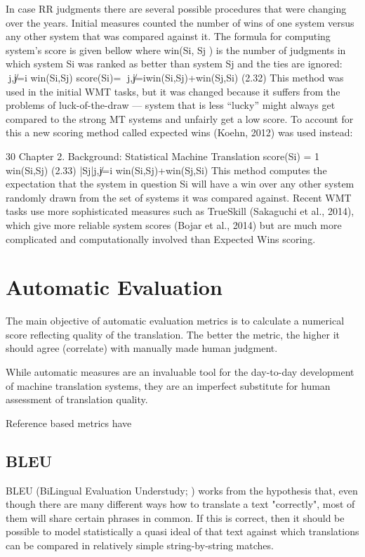 In case RR judgments there are several possible procedures that were changing over the years. Initial measures counted the number of wins of one system versus any other system that was compared against it. The formula for computing system’s score is given bellow where win(Si, Sj ) is the number of judgments in which system Si was ranked as better than system Sj and the ties are ignored:
􏰇j,j̸=i win(Si,Sj)
score(Si)= 􏰇j,j̸=iwin(Si,Sj)+win(Sj,Si) (2.32)
This method was used in the initial WMT tasks, but it was changed because it suffers from the problems of luck-of-the-draw — system that is less “lucky” might always get compared to the strong MT systems and unfairly get a low score.
To account for this a new scoring method called expected wins (Koehn, 2012) was used instead:
 
30 Chapter 2. Background: Statistical Machine Translation
score(Si) = 1 􏰉 win(Si,Sj) (2.33) |{Sj}|j,j̸=i win(Si,Sj)+win(Sj,Si)
This method computes the expectation that the system in question Si will have a win over any other system randomly drawn from the set of systems it was compared against.
Recent WMT tasks use more sophisticated measures such as TrueSkill (Sakaguchi et al., 2014), which give more reliable system scores (Bojar et al., 2014) but are much more complicated and computationally involved than Expected Wins scoring.

\section{Automatic Evaluation}
The main objective of automatic evaluation metrics is to calculate a numerical 
score reflecting quality of the translation. The better the metric, the higher it
should agree (correlate) with manually made human judgment. 

While automatic measures are an invaluable tool for the day-to-day development of machine translation systems, they are an imperfect substitute for human assessment of translation quality. 

Reference based metrics have 


\subsection{BLEU}
BLEU (BiLingual Evaluation Understudy; \cite{bleu}) works from the hypothesis that, even though there are many different
ways how to translate a text "correctly", most of them will share certain phrases in common. If this is correct, then it should
be possible to model statistically a quasi ideal of that text against which translations can be compared in relatively simple 
string-by-string matches. 


